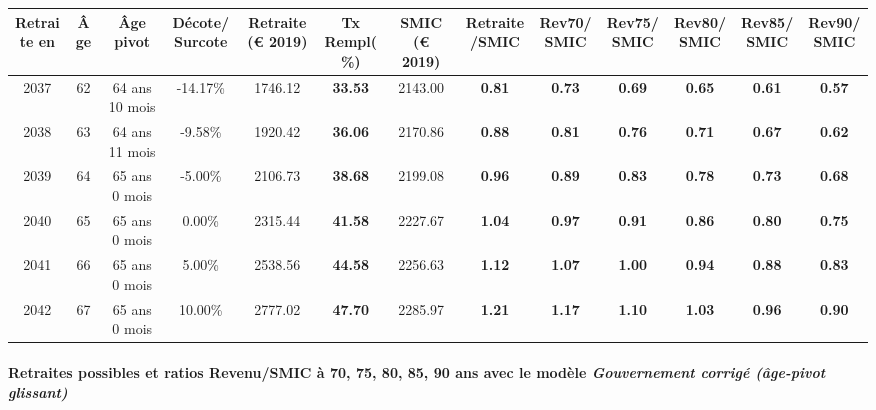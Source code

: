 { \scriptsize \begin{center} 
\begin{tabular}[htb]{|c|c||c|c||c|c||c||c|c|c|c|c|c|} 
\hline 
 Retraite en &  Âge &  Âge pivot &  Décote/Surcote &  Retraite (\euro{} 2019) &  Tx Rempl(\%) &  SMIC (\euro{} 2019) &  Retraite/SMIC &  Rev70/SMIC &  Rev75/SMIC &  Rev80/SMIC &  Rev85/SMIC &  Rev90/SMIC \\ 
\hline \hline 
 2037 &  62 &  64 ans 10 mois &  -14.17\% &  1746.12 &  {\bf 33.53} &  2143.00 &  {\bf {\color{red} 0.81}} &  {\bf {\color{red} 0.73}} &  {\bf {\color{red} 0.69}} &  {\bf {\color{red} 0.65}} &  {\bf {\color{red} 0.61}} &  {\bf {\color{red} 0.57}} \\ 
\hline 
 2038 &  63 &  64 ans 11 mois &  -9.58\% &  1920.42 &  {\bf 36.06} &  2170.86 &  {\bf {\color{red} 0.88}} &  {\bf {\color{red} 0.81}} &  {\bf {\color{red} 0.76}} &  {\bf {\color{red} 0.71}} &  {\bf {\color{red} 0.67}} &  {\bf {\color{red} 0.62}} \\ 
\hline 
 2039 &  64 &  65 ans 0 mois &  -5.00\% &  2106.73 &  {\bf 38.68} &  2199.08 &  {\bf {\color{red} 0.96}} &  {\bf {\color{red} 0.89}} &  {\bf {\color{red} 0.83}} &  {\bf {\color{red} 0.78}} &  {\bf {\color{red} 0.73}} &  {\bf {\color{red} 0.68}} \\ 
\hline 
 2040 &  65 &  65 ans 0 mois &  0.00\% &  2315.44 &  {\bf 41.58} &  2227.67 &  {\bf 1.04} &  {\bf {\color{red} 0.97}} &  {\bf {\color{red} 0.91}} &  {\bf {\color{red} 0.86}} &  {\bf {\color{red} 0.80}} &  {\bf {\color{red} 0.75}} \\ 
\hline 
 2041 &  66 &  65 ans 0 mois &  5.00\% &  2538.56 &  {\bf 44.58} &  2256.63 &  {\bf 1.12} &  {\bf 1.07} &  {\bf 1.00} &  {\bf {\color{red} 0.94}} &  {\bf {\color{red} 0.88}} &  {\bf {\color{red} 0.83}} \\ 
\hline 
 2042 &  67 &  65 ans 0 mois &  10.00\% &  2777.02 &  {\bf 47.70} &  2285.97 &  {\bf 1.21} &  {\bf 1.17} &  {\bf 1.10} &  {\bf 1.03} &  {\bf {\color{red} 0.96}} &  {\bf {\color{red} 0.90}} \\ 
\hline 
\hline 
\end{tabular} 
\end{center} } 
\paragraph{Retraites possibles et ratios Revenu/SMIC à 70, 75, 80, 85, 90 ans avec le modèle \emph{Gouvernement corrigé (âge-pivot glissant)}}  
 
